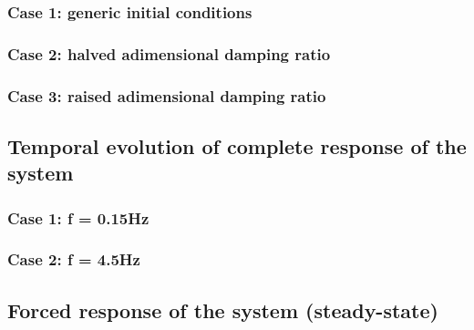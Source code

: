 \documentclass[a4paper,12pt,oneside]{article}
\begin{document}
\subsubsection*{Case 1: generic initial conditions}



\subsubsection*{Case 2: halved adimensional damping ratio}



\subsubsection*{Case 3: raised adimensional damping ratio}



\subsection{Temporal evolution of complete response of the system}



\subsubsection*{Case 1: f = 0.15Hz}



\subsubsection*{Case 2: f = 4.5Hz}



\subsection{Forced response of the system (steady-state)}
\end{document}
